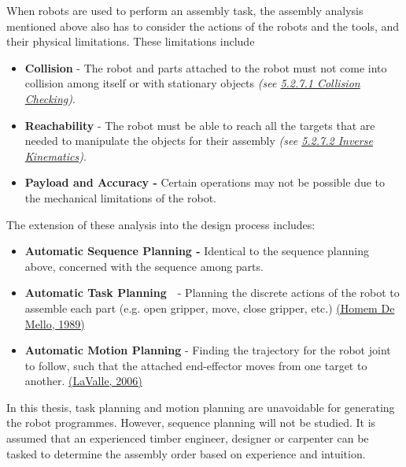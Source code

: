 \documentclass[11pt]{book}
\begin{document}
When robots are used to perform an assembly task, the assembly analysis mentioned above also has to consider the actions of the robots and the tools, and their physical limitations. These limitations include

\begin{itemize}
	\item \begin{flushleft}
\textbf{Collision }- The robot and parts attached to the robot must not come into collision among itself or with stationary objects \textit{(see \underline{5.2.7.1 Collision Checking})}.
\end{flushleft}


\end{itemize}
\begin{itemize}
	\item \textbf{Reachability }- The robot must be able to reach all the targets that are needed to manipulate the objects for their assembly \textit{(see \underline{5.2.7.2 Inverse Kinematics})}.

	\item \textbf{Payload and Accuracy - }Certain operations may not be possible due to the mechanical limitations of the robot.

\end{itemize}
The extension of these analysis into the design process includes:

\begin{itemize}
	\item \textbf{Automatic Sequence Planning - }Identical to the sequence planning above, concerned with the sequence among parts.

	\item \textbf{Automatic Task Planning}\ \ - Planning the discrete actions of the robot to assemble each part (e.g. open gripper, move, close gripper, etc.) \href{https://www.zotero.org/google-docs/?YRv70u}{(Homem De Mello, 1989)}

	\item \textbf{Automatic Motion Planning} - Finding the trajectory for the robot joint to follow, such that the attached end-effector moves from one target to another.  \href{https://www.zotero.org/google-docs/?dDVZq8}{(LaValle, 2006)}

\end{itemize}
\begin{flushleft}
In this thesis, task planning and motion planning are unavoidable for generating the robot programmes. However, sequence planning will not be studied. It is assumed that an experienced timber engineer, designer or carpenter can be tasked to determine the assembly order based on experience and intuition.
\end{flushleft}
\end{document}
